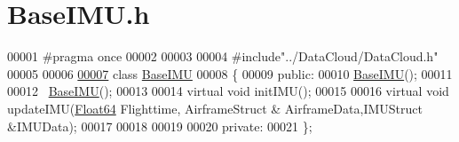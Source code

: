 \hypertarget{_base_i_m_u_8h_source}{}\section{Base\+I\+M\+U.\+h}
\label{_base_i_m_u_8h_source}

\begin{DoxyCode}
00001 \textcolor{preprocessor}{#pragma once}
00002 
00003 
00004 \textcolor{preprocessor}{#include"../DataCloud/DataCloud.h"}
00005 
00006 
\hyperlink{class_base_i_m_u}{00007} \textcolor{keyword}{class }\hyperlink{class_base_i_m_u}{BaseIMU}
00008 \{
00009 \textcolor{keyword}{public}:
00010     \hyperlink{class_base_i_m_u}{BaseIMU}();
00011 
00012     ~\hyperlink{class_base_i_m_u}{BaseIMU}();
00013 
00014     \textcolor{keyword}{virtual} \textcolor{keywordtype}{void} initIMU();
00015 
00016     \textcolor{keyword}{virtual} \textcolor{keywordtype}{void} updateIMU(\hyperlink{group___tools_ga3f1431cb9f76da10f59246d1d743dc2c}{Float64} Flighttime, AirframeStruct & AirframeData,IMUStruct &IMUData);
00017 
00018 
00019 
00020 \textcolor{keyword}{private}:
00021 \};
\end{DoxyCode}
